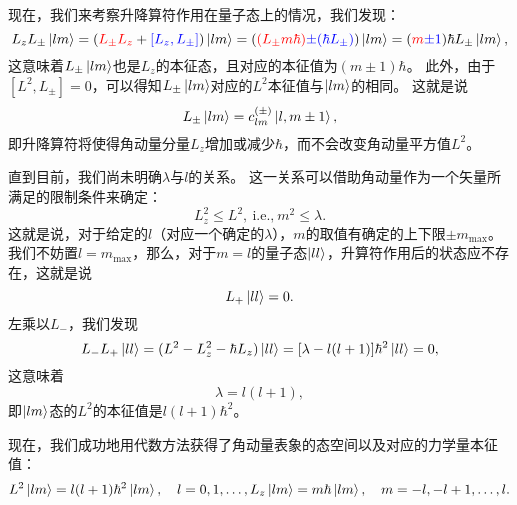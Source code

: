 现在，我们来考察升降算符作用在量子态上的情况，我们发现：
\begin{equation}
    L_z L_\pm \ket{lm}
    = (\textcolor{red}{L_\pm L_z} + \textcolor{blue}{[L_z, L_\pm]}) \ket{lm}
    = (\textcolor{red}{(L_\pm m\hbar)} \textcolor{blue}{\pm (\hbar L_\pm)}) \ket{lm}
    = (\textcolor{red}{m}\textcolor{blue}{\pm 1})\hbar L_\pm \ket{lm},
\end{equation}
这意味着$L_\pm\ket{lm}$也是$L_z$的本征态，且对应的本征值为$(m\pm 1)\hbar$。
此外，由于$[L^2, L_\pm] = 0$，可以得知$L_\pm\ket{lm}$对应的$L^2$本征值与$\ket{lm}$的相同。
这就是说
\begin{equation}
    L_\pm \ket{lm} = c_{lm}^{(\pm)} \ket{l,m\pm 1},
\end{equation}
即升降算符将使得角动量分量$L_z$增加或减少$\hbar$，而不会改变角动量平方值$L^2$。

直到目前，我们尚未明确$\lambda$与$l$的关系。
这一关系可以借助角动量作为一个矢量所满足的限制条件来确定：
\begin{equation}
    L_z^2 \leq L^2, \ \text{i.e.,}\ m^2 \leq \lambda.
\end{equation}
这就是说，对于给定的$l$（对应一个确定的$\lambda$），$m$的取值有确定的上下限$\pm m_{\text{max}}$。
我们不妨置$l=m_{\text{max}}$，那么，对于$m=l$的量子态$\ket{ll}$，升算符作用后的状态应不存在，这就是说
\begin{equation}
    L_+ \ket{ll} = 0.
\end{equation}
左乘以$L_-$，我们发现
\begin{equation}
    L_- L_+ \ket{ll} = (L^2 - L_z^2 - \hbar L_z) \ket{ll} = [\lambda - l(l+1)]\hbar^2 \ket{ll} = 0,
\end{equation}
这意味着
\begin{equation}
    \lambda = l(l+1),
\end{equation}
即$\ket{lm}$态的$L^2$的本征值是$l(l+1)\hbar^2$。

现在，我们成功地用代数方法获得了角动量表象的态空间以及对应的力学量本征值：
\begin{equation}
    L^2 \ket{lm} = l(l+1)\hbar^2 \ket{lm},\quad l=0,1,\ldots,
    L_z \ket{lm} = m\hbar \ket{lm},\quad m=-l,-l+1,\ldots,l.
\end{equation}

